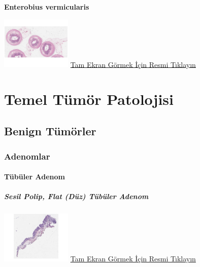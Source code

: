 \documentclass[
  letterpaper,
  DIV=11,
  numbers=noendperiod]{scrreprt}
\begin{document}
\textbf{Enterobius vermicularis}

\href{https://images.patolojiatlasi.com/enterobius-vermicularis/HE.html}{\includegraphics[width=0.25\textwidth,height=\textheight]{./screenshots/thumbnail_enterobius-vermicularis.png}}
\href{https://images.patolojiatlasi.com/enterobius-vermicularis/HE.html}{Tam
Ekran Görmek İçin Resmi Tıklayın}

\part{Temel Tümör Patolojisi}

\hypertarget{sec-benign-tumorler}{%
\chapter{Benign Tümörler}\label{sec-benign-tumorler}}

\hypertarget{sec-adenomlar}{%
\section{Adenomlar}\label{sec-adenomlar}}

\hypertarget{sec-tubuler-adenom}{%
\subsection{Tübüler Adenom}\label{sec-tubuler-adenom}}

\hypertarget{sec-sesil-polip}{%
\subsubsection{Sesil Polip, Flat (Düz) Tübüler
Adenom}\label{sec-sesil-polip}}

\href{https://images.patolojiatlasi.com/tubularadenoma-flat/HE.html}{\includegraphics[width=0.25\textwidth,height=\textheight]{./screenshots/thumbnail_tubularadenoma-flat1.png}}
\href{https://images.patolojiatlasi.com/tubularadenoma-flat/HE.html}{Tam
Ekran Görmek İçin Resmi Tıklayın}
\end{document}
